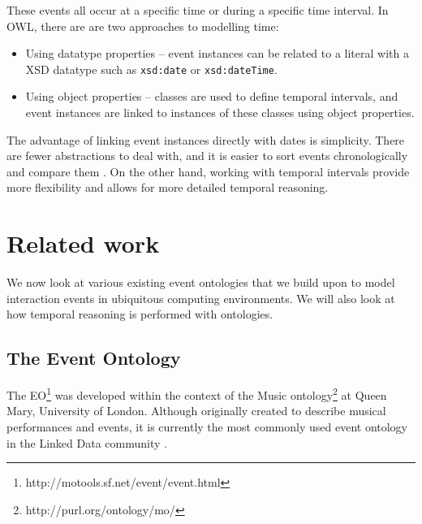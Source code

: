 



These events all occur at a specific time or during a specific time interval. In \ac{OWL}, there are are two approaches to modelling time:

\begin{itemize}
	\item Using datatype properties -- event instances can be related to a literal with a \ac{XSD} datatype such as \texttt{xsd:date} or \texttt{xsd:dateTime}. %
	\item Using object properties -- classes are used to define temporal intervals, and event instances are linked to instances of these classes using object properties.
\end{itemize}

The advantage of linking event instances directly with dates is simplicity. There are fewer abstractions to deal with, and it is easier to sort events chronologically and compare them \cite{Shaw2009}. On the other hand, working with temporal intervals provide more flexibility and allows for more detailed temporal reasoning.

\section{Related work}
We now look at various existing event ontologies that we build upon to model interaction events in ubiquitous computing environments. We will also look at how temporal reasoning is performed with ontologies.

\subsection{The Event Ontology}
The \ac{EO}\footnote{http://motools.sf.net/event/event.html} was developed within the context of the Music ontology\footnote{http://purl.org/ontology/mo/} at Queen Mary, University of London. Although originally created to describe musical performances and events, it is currently the most commonly used event ontology in the Linked Data community \cite{Shaw2009}.

